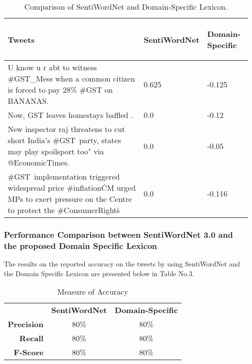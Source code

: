 \documentclass[a4paper, 10pt, conference]{ieeeconf}
\begin{document}
\begin{table}[h]
	\caption{Comparison of SentiWordNet and Domain-Specific Lexicon.}
	\label{table_example}
	\begin{tabular}{|L{3cm}|C{2cm}|R{1.5cm}|}
		\hline
		\begin{center}
			\textbf{Tweets}
		\end{center}&\begin{center}	\textbf{SentiWordNet}\end{center}&\begin{center}\textbf{Domain-Specific}\end{center} \\
		\hline
		U know u r abt to witness \#GST\_Mess when a common citizen is forced to pay 28\% \#GST on BANANAS. &0.625 & -0.125\\
		\hline
		Now, GST leaves homestays baffled . &0.0 & -0.12\\
		\hline
		New inspector raj threatens to cut short India's \#GST\ party, states may play spoilsport too" via @EconomicTimes. &0.0 &-0.05\\
		\hline
		\#GST\ implementation triggered widespread price \#inflation\. CM urged MPs to exert pressure on the Centre to protect the \#ConsumerRights\.  &0.0 &-0.116\\
		\hline
	\end{tabular}
\end{table}

\subsubsection{Performance Comparison between SentiWordNet 3.0 and the proposed Domain Specific Lexicon}
The results on the reported accuracy on the tweets by using SentiWordNet and the Domain Specific Lexicon are presented below in Table No.3.
\begin{table}[h]
	\caption{Measure of Accuracy}
	\label{table 2}
	\begin{tabular}{ r|c|c| }
		\multicolumn{1}{r}{}
		&  \multicolumn{1}{c}{\textbf{SentiWordNet}}
		& \multicolumn{1}{c}{\textbf{Domain-Specific}} \\
		\cline{2-3}
		\textbf{Precision} & 80\% & 80\% \\
		\cline{2-3}
		\textbf{Recall} & 80\% & 80\% \\
		\cline{2-3}
		\textbf{F-Score} & 80\% & 80\% \\
		\cline{2-3}
	\end{tabular}
	
\end{table}  
\end{document}
